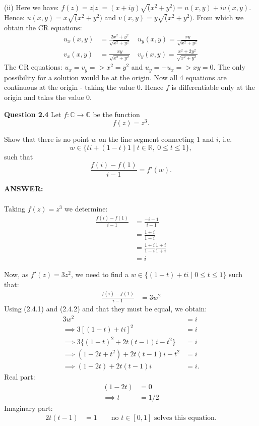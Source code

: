 \documentclass[12pt,a4paper]{article}
\newcommand{\question}[2]{\textbf{Question #1}\quad #2}
\begin{document}
\newpage
\noindent
(ii) Here we have: $f(z) = z|z| = (x + iy) \sqrt(x^2 + y^2) = u(x,y) + iv(x,y)$.\\
Hence: $u(x,y)=x \sqrt(x^2 + y^2)$ and $v(x,y)=y \sqrt(x^2 + y^2)$. From which we obtain the CR equations:
\begin{align*}
    u_x(x,y) &= \frac{2x^2 + y^2}{\sqrt{x^2 + y^2}} \quad u_y(x,y) = \frac{xy}{\sqrt{x^2 + y^2}} \\
    v_x(x,y) &= \frac{xy}{\sqrt{x^2 + y^2}} \quad v_y(x,y) = \frac{x^2 + 2y^2}{\sqrt{x^2 + y^2}}
\end{align*}
The CR equations: $u_x = v_y => x^2=y^2$ and $u_y = -u_x => xy=0$.  The only possibility for a solution would be at the origin.
Now all 4 equations are continuous at the origin - taking the value 0.  Hence $f$ is differentiable only at the origin and takes the
value 0.

\newpage

\question{2.4}{
Let $f:\mathbb{C}\to\mathbb{C}$ be the function
\[
f(z)=z^3.
\]

Show that there is no point $w$ on the line segment connecting $1$ and $i$, i.e.
\[
w\in\{ti+(1-t)1\mid t\in\mathbb{R},\ 0\leq t\leq 1\},
\]
such that
\[
\frac{f(i)-f(1)}{i-1}=f'(w).
\]
}

\vspace{1cm}

\textbf{ANSWER:} \\
\\
Taking $f(z) = z^3$ we determine:
\begin{align*}
\frac{f(i)-f(1)}{i-1} &= \frac{-i-1}{i-1} \\
 &= \frac{1+i}{1-i} \\
 &= \frac{1+i}{1-i} \frac{1+i}{1+i} \\
 &= i \tag{2.4.1}
\end{align*}

Now, as $f'(z) = 3z^2$, we need to find a $w \in \{(1-t) + ti \; | \; 0 \le t \le 1 \}$ such that:
\begin{align*}
\frac{f(i)-f(1)}{i-1} &= 3w^2 \tag{2.4.2}
\end{align*}
Using (2.4.1) and (2.4.2) and that they must be equal, we obtain:
\begin{align*}
 3w^2 &= i \\
 \implies 3[(1-t) + ti]^2 &= i \\
 \implies 3\{(1-t)^2+2t(t-1)i-t^2\} &=i \\
 \implies (1-2t+t^2)+2t(t-1)i-t^2 &= i \\
 \implies (1-2t)+2t(t-1)i &= i.
\end{align*}
Real part:
\begin{align*}
  (1-2t) &= 0 \\
  \implies t &= 1/2
\end{align*}
Imaginary part:
\begin{align*}
  2t(t-1) &= 1 \qquad \text{no }t\in[0,1]\text{ solves this equation.}
\end{align*}
\end{document}
